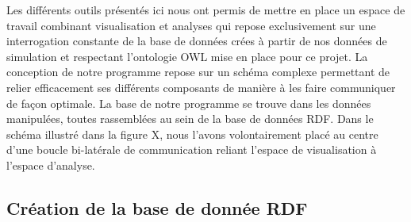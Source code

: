 Les différents outils présentés ici nous ont permis de mettre en place un espace de travail combinant visualisation et analyses qui repose exclusivement sur une interrogation constante de la base de données crées à partir de nos données de simulation et respectant l'ontologie OWL mise en place pour ce projet.
La conception de notre programme repose sur un schéma complexe permettant de relier efficacement ses différents composants de manière à les faire communiquer de façon optimale. La base de notre programme se trouve dans les données manipulées, toutes rassemblées au sein de la base de données RDF. Dans le schéma illustré dans la figure X, nous l'avons volontairement placé au centre d'une boucle bi-latérale de communication reliant l'espace de visualisation à l'espace d'analyse.

\subsection{Création de la base de donnée RDF}

